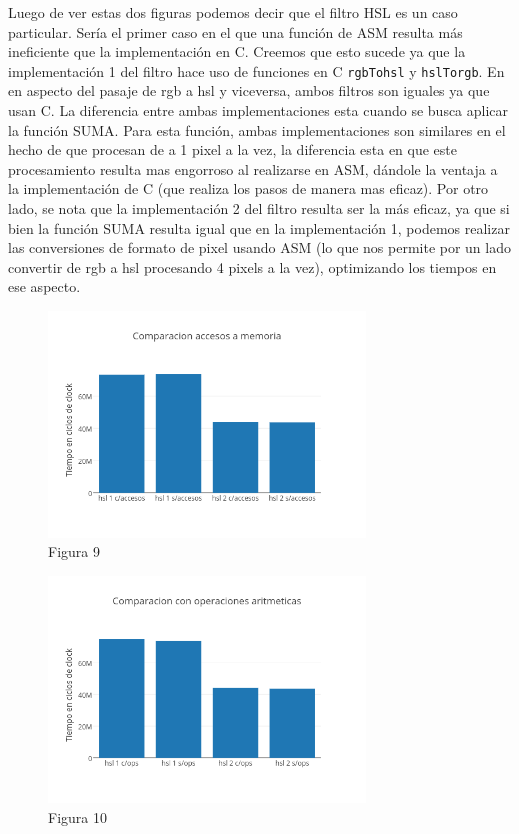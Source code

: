 \documentclass[a4paper]{article}
\begin{document}
Luego de ver estas dos figuras podemos decir que el filtro HSL es un caso particular. Sería el primer caso en el que una función de ASM resulta más ineficiente que la implementación en C. Creemos que esto sucede ya que la implementación 1 del filtro hace uso de funciones en C {\tt rgbTohsl} y {\tt hslTorgb}. En en aspecto del pasaje de rgb a hsl y viceversa, ambos filtros son iguales ya que usan C. La diferencia entre ambas implementaciones esta cuando se busca aplicar la función SUMA. Para esta función, ambas implementaciones son similares en el hecho de que procesan de a 1 pixel a la vez, la diferencia esta en que este procesamiento resulta mas engorroso al realizarse en ASM, dándole la ventaja a la implementación de C (que realiza los pasos de manera mas eficaz).
Por otro lado, se nota que la implementación 2 del filtro resulta ser la más eficaz, ya que si bien la función SUMA resulta igual que en la implementación 1, podemos realizar las conversiones de formato de pixel usando ASM (lo que nos permite por un lado convertir de rgb a hsl procesando 4 pixels a la vez), optimizando los tiempos en ese aspecto.
 

\begin{figure}[h]
  \centering
    \includegraphics[width=0.75\textwidth]{imagenes/ComparacionAccesosAMemoriaHslColores.png}
  \caption{Figura 9}
  \label{fig:graficohsl3}
\end{figure}
 \FloatBarrier

\begin{figure}[h]
  \centering
    \includegraphics[width=0.75\textwidth]{imagenes/ComparacionConOperacionesAritmeticasHslColores.png}
  \caption{Figura 10}
  \label{fig:graficohsl4}
\end{figure}
 \FloatBarrier
\end{document}

